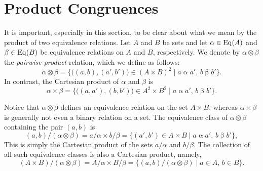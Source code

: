 \bigskip


\vfill


\appendix

\section{Product Congruences}
It is important, especially in this section, to be clear about what we mean
by the product of two equivalence relations.
Let $A$ and $B$ be sets and let $\alpha \in \operatorname{Eq}(A)$ and $\beta \in \operatorname{Eq}(B)$
be equivalence relations on $A$ and $B$, respectively.
We denote by $\alpha \otimes \beta$ the \emph{pairwise product} relation,
which we define as follows:
\begin{equation}
\label{eq:pair-product}
\alpha \otimes \beta = \{\bigl((a, b), (a', b')\bigr) 
\in (A\times B)^2 \mid a\mathrel{\alpha} a', \, b\mathrel{\beta} b'\}.
\end{equation}
In contrast, the Cartesian product of $\alpha$ and $\beta$ is 
\begin{equation}
\label{eq:set-product}
\alpha \times \beta = \{\bigl((a, a'), (b, b')\bigr) 
\in A^2\times B^2 \mid a\mathrel{\alpha} a', \, b\mathrel{\beta} b'\}.
\end{equation}

Notice that $\alpha \otimes \beta$ defines an equivalence relation on the set
$A\times B$, whereas $\alpha\times \beta$ is generally
not even a binary relation on a set.
The equivalence class of $\alpha \otimes \beta$ containing the pair
$(a, b)$ is %
  \[(a,b)/(\alpha \otimes \beta) = a/\alpha \times b/\beta= 
    \{(a', b') \in A\times B \mid a\mathrel{\alpha} a', \, b\mathrel{\beta} b'\},
    \]
This is simply the Cartesian product of the sets $a/\alpha$ and $b/\beta$.
The collection of all such equivalence classes is also a Cartesian product, namely,
\[
(A\times B)/(\alpha \otimes \beta) =
A/\alpha \times B/\beta  = \{(a, b)/(\alpha \otimes \beta) \mid a\in A,\,b \in B\}.\]

